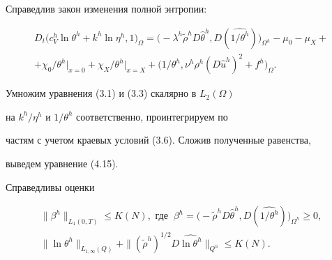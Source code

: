 \documentclass[12pt]{article}
\theoremstyle{plain} %
\newtheorem{lemm}{\hskip\parindent Лемма}[section]
\theoremstyle{definition}
\newtheorem{corm}{\hskip\parindent Следствие}[section]
\numberwithin{equation}{section}
\begin{document}
\begin{lemm} Справедлив закон изменения полной энтропии:


\begin{multline}


D_t\bigl(c_V^h\ln\theta^h + k^h\ln\eta^h,1\bigr)_\Omega =


\bigl(-\lambda^h \widetilde\rho^h D\widehat\theta^h,


D(\widehat{1/{\theta^h}})\bigr)_{\Omega^h}


-\mu_0 - \mu_X +\\


%


+\chi_0/{\theta^h|_{x=0}} +\chi_X/{\theta^h|_{x=X}} +


\bigl(1/\theta^h, \nu^h \rho^h


\left(D\widehat u^h\right)^2 + f^h\bigr)_\Omega.


\end{multline}


\end{lemm}





\begin{pf} Умножим уравнения (3.1) и (3.3) скалярно в $L_2(\Omega)$


на ${k^h}/{\eta^h}$ и $1/\theta^h$ соответственно, проинтегрируем по


частям с учетом краевых условий (3.6). Сложив полученные равенства,


выведем уравнение (4.15).


\end{pf}





\begin{corm} Справедливы оценки


\begin{gather}


\|\beta^h\|_{L_1(0,T)}\le K(N),\text{ где }\


\beta^h = \bigl(-\widetilde\rho^h


D\widehat\theta^h, D(\widehat{1/{\theta^h}})\bigr)_{\Omega^h}\ge 0,\\


%


\|\ln \theta^h\|_{L_{1,\infty}(Q)}+


\|(\widetilde\rho^h)^{1/2}D\widehat{\ln \theta^h}\|_{Q^h}


\le K(N).


\end{gather}


\end{corm}
\end{document}
